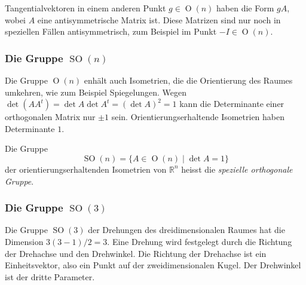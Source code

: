 Tangentialvektoren in einem anderen Punkt $g\in\operatorname{O}(n)$
haben die Form $gA$, wobei $A$ eine antisymmetrische Matrix ist.
Diese Matrizen sind nur noch in speziellen Fällen antisymmetrisch,
zum Beispiel im Punkt $-I\in\operatorname{O}(n)$.

\subsubsection{Die Gruppe $\operatorname{SO}(n)$}
Die Gruppe $\operatorname{O}(n)$ enhält auch Isometrien, die
die Orientierung des Raumes umkehren, wie zum Beispiel Spiegelungen.
Wegen $\det (AA^t)=\det A\det A^t = (\det A)^2=1$ kann die Determinante
einer orthogonalen Matrix nur $\pm 1$ sein.
Orientierungserhaltende Isometrien haben Determinante $1$.

\begin{definition}
Die Gruppe
\[
\operatorname{SO}(n)
=
\{A\in\operatorname{O}(n)\mid\det A=1\}
\]
der orientierungserhaltenden Isometrien von $\mathbb{R}^n$
heisst die {\em spezielle orthogonale Gruppe}.
%
%
%
%
\end{definition}


\subsubsection{Die Gruppe $\operatorname{SO}(3)$}
Die Gruppe $\operatorname{SO}(3)$ der Drehungen des dreidimensionalen
Raumes hat die Dimension $3(3-1)/2=3$.
Eine Drehung wird festgelegt durch die Richtung der Drehachse und den
Drehwinkel.
Die Richtung der Drehachse ist ein Einheitsvektor, also ein Punkt
auf der zweidimensionalen Kugel.
Der Drehwinkel ist der dritte Parameter.

